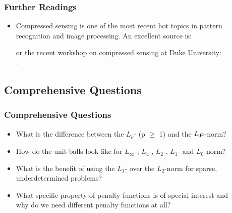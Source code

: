 \begin{frame}
  \frametitle{Further Readings \cont}

  \begin{itemize}
    \item Compressed sensing is one of the most recent hot topics in pattern recognition and image processing. An excellent source is: \\[.3cm]
      \centerline{}
      \vspace{.3cm}
      or the recent workshop on compressed sensing at Duke University: \\[.3cm]
    .
  \end{itemize}
\end{frame}


\subsection{Comprehensive Questions}

\begin{frame}
  \frametitle{Comprehensive Questions}

  \begin{itemize}
    \item What is the difference between the $L_p$- (p $\ge$ 1) and the $L_{{\bm P}}$-norm? \\[1cm]
    \item How do the unit balls look like for $L_{\infty}$-, $L_4$-, $L_2$-, $L_1$- and $L_0$-norm? \\[1cm]
    \item What is the benefit of using the $L_1$- over the $L_2$-norm for sparse, underdetermined problems? \\[1cm]
    \item What specific property of penalty functions is of special interest and \\
      why do we need different penalty functions at all? 
  \end{itemize}
\end{frame}

